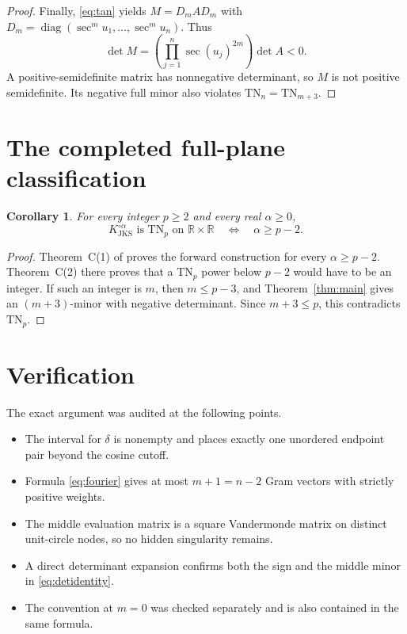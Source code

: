 \documentclass[11pt]{article}
\newtheorem{corollary}{Corollary}
\newcommand{\R}{\mathbb R}
\newcommand{\TN}{\mathrm{TN}}
\newcommand{\JKS}{\mathrm{JKS}}
\begin{document}
\begin{proof}
Finally, \eqref{eq:tan} yields $M=D_m A D_m$ with
$D_m=\operatorname{diag}(\sec^m u_1,\ldots,\sec^m u_n)$.  Thus
\[
 \det M=\left(\prod_{j=1}^n\sec(u_j)^{2m}\right)\det A<0.
\]
A positive-semidefinite matrix has nonnegative determinant, so $M$ is not
positive semidefinite.  Its negative full minor also violates
$\TN_n=\TN_{m+3}$.
\end{proof}

\section{The completed full-plane classification}

\begin{corollary}\label{cor:classification}
For every integer $p\geq2$ and every real $\alpha\geq0$,
\[
 K_{\JKS}^{\circ\alpha}\text{ is }\TN_p\text{ on }\R\times\R
 \quad\Longleftrightarrow\quad
 \alpha\geq p-2.
\]
\end{corollary}

\begin{proof}
Theorem~C(1) of \cite{KhareJKS} proves the forward construction for every
$\alpha\geq p-2$.  Theorem~C(2) there proves that a $\TN_p$ power below
$p-2$ would have to be an integer.  If such an integer is $m$, then
$m\leq p-3$, and Theorem~\ref{thm:main} gives an $(m+3)$-minor with negative
determinant.  Since $m+3\leq p$, this contradicts $\TN_p$.
\end{proof}

\section{Verification}

The exact argument was audited at the following points.
\begin{itemize}
 \item The interval for $\delta$ is nonempty and places exactly one unordered
 endpoint pair beyond the cosine cutoff.
 \item Formula \eqref{eq:fourier} gives at most $m+1=n-2$ Gram vectors with
 strictly positive weights.
 \item The middle evaluation matrix is a square Vandermonde matrix on distinct
 unit-circle nodes, so no hidden singularity remains.
 \item A direct determinant expansion confirms both the sign and the middle
 minor in \eqref{eq:detidentity}.
 \item The convention at $m=0$ was checked separately and is also contained in
 the same formula.
\end{itemize}
\end{document}

